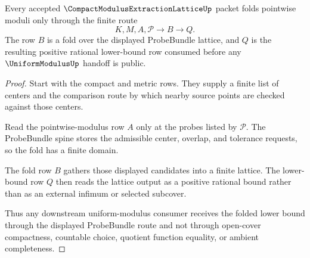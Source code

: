 \begin{theorem}
\label{thm:compact-modulus-extraction-lattice-probebundle-fold}
Every accepted $\CompactModulusExtractionLatticeUp$ packet folds pointwise moduli only through the finite route
$$
K,M,A,\mathcal{P} \longrightarrow B \longrightarrow Q .
$$
The row $B$ is a fold over the displayed ProbeBundle lattice, and $Q$ is the resulting positive rational lower-bound row consumed before any $\UniformModulusUp$ handoff is public.
\end{theorem}
\begin{proof}
Start with the compact and metric rows. They supply a finite list of centers and the comparison route by which nearby source points are checked against those centers.

Read the pointwise-modulus row $A$ only at the probes listed by $\mathcal{P}$. The ProbeBundle spine stores the admissible center, overlap, and tolerance requests, so the fold has a finite domain.

The fold row $B$ gathers those displayed candidates into a finite lattice. The lower-bound row $Q$ then reads the lattice output as a positive rational bound rather than as an external infimum or selected subcover.

Thus any downstream uniform-modulus consumer receives the folded lower bound through the displayed ProbeBundle route and not through open-cover compactness, countable choice, quotient function equality, or ambient completeness.
\end{proof}

